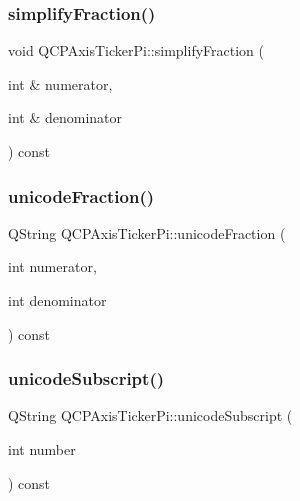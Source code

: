 \subsubsection{\texorpdfstring{simplifyFraction()}{simplifyFraction()}}
{\footnotesize\ttfamily void Q\+C\+P\+Axis\+Ticker\+Pi\+::simplify\+Fraction (\begin{DoxyParamCaption}\item[{int \&}]{numerator,  }\item[{int \&}]{denominator }\end{DoxyParamCaption}) const\hspace{0.3cm}{\ttfamily [protected]}}

\mbox{\label{class_q_c_p_axis_ticker_pi_ade6f7e49238e986e9aed74178a78d8d3}} 
\subsubsection{\texorpdfstring{unicodeFraction()}{unicodeFraction()}}
{\footnotesize\ttfamily Q\+String Q\+C\+P\+Axis\+Ticker\+Pi\+::unicode\+Fraction (\begin{DoxyParamCaption}\item[{int}]{numerator,  }\item[{int}]{denominator }\end{DoxyParamCaption}) const\hspace{0.3cm}{\ttfamily [protected]}}

\mbox{\label{class_q_c_p_axis_ticker_pi_a5b3bb340adb888a30a96225e1ca23c7a}} 
\subsubsection{\texorpdfstring{unicodeSubscript()}{unicodeSubscript()}}
{\footnotesize\ttfamily Q\+String Q\+C\+P\+Axis\+Ticker\+Pi\+::unicode\+Subscript (\begin{DoxyParamCaption}\item[{int}]{number }\end{DoxyParamCaption}) const\hspace{0.3cm}{\ttfamily [protected]}}

